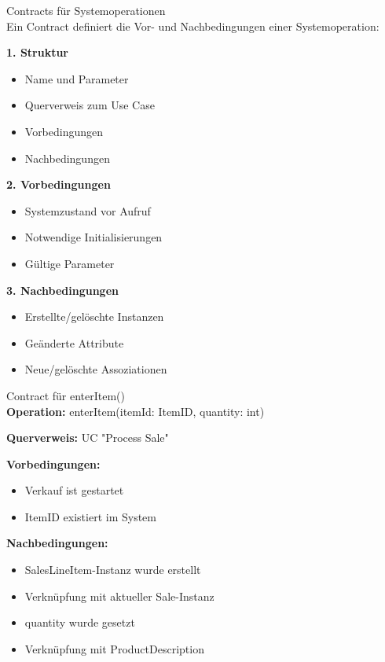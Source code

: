 \begin{KR}{Contracts für Systemoperationen}\\
Ein Contract definiert die Vor- und Nachbedingungen einer Systemoperation:

\textbf{1. Struktur}
\begin{itemize}
    \item Name und Parameter
    \item Querverweis zum Use Case
    \item Vorbedingungen
    \item Nachbedingungen
\end{itemize}

\textbf{2. Vorbedingungen}
\begin{itemize}
    \item Systemzustand vor Aufruf
    \item Notwendige Initialisierungen
    \item Gültige Parameter
\end{itemize}

\textbf{3. Nachbedingungen}
\begin{itemize}
    \item Erstellte/gelöschte Instanzen
    \item Geänderte Attribute
    \item Neue/gelöschte Assoziationen
\end{itemize}
\end{KR}

\begin{example2}{Contract für enterItem()}\\
\textbf{Operation:} enterItem(itemId: ItemID, quantity: int)

\textbf{Querverweis:} UC "Process Sale"

\textbf{Vorbedingungen:}
\begin{itemize}
    \item Verkauf ist gestartet
    \item ItemID existiert im System
\end{itemize}

\textbf{Nachbedingungen:}
\begin{itemize}
    \item SalesLineItem-Instanz wurde erstellt
    \item Verknüpfung mit aktueller Sale-Instanz
    \item quantity wurde gesetzt
    \item Verknüpfung mit ProductDescription
\end{itemize}
\end{example2}


